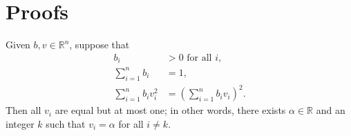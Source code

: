 \section{Proofs}\label{appendixA}

\begin{lem}\label{Davids_lemma}
	Given $b,v \in \mathbb{R}^{n}$, suppose that
    \begin{subequations}\label{eq:DavidsLemma}
    		\begin{align}
    			b_i & > 0 \mbox{ for all } i, \label{eq:DavidsLemma_a} \\
    			\sum_{i=1}^n b_i & = 1, \label{eq:DavidsLemma_b} \\
    			\sum_{i=1}^n b_i v_i^2 & = \left(\sum_{i=1}^n b_i v_i \right)^2. \label{eq:DavidsLemma_c}
    		\end{align}
    	\end{subequations}
    	Then all $v_i$ are equal but at most one; in other words, there exists $\alpha \in \mathbb{R}$ and an integer $k$ such that $v_i = \alpha$ for all $i \ne k$.
\end{lem}

